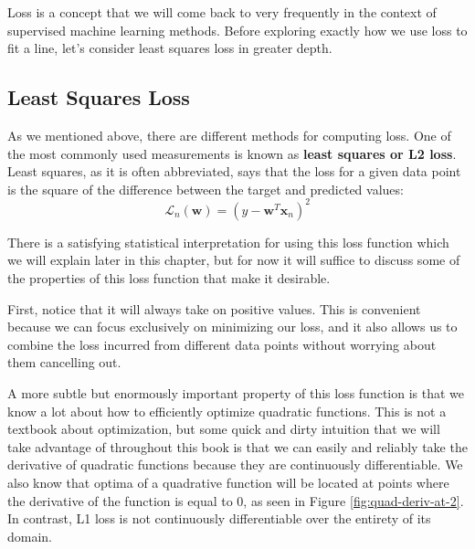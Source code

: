 Loss is a concept that we will come back to very frequently in the context of supervised machine learning methods. Before exploring exactly how we use loss to fit a line, let's consider least squares loss in greater depth.

\subsection{Least Squares Loss}
As we mentioned above, there are different methods for computing loss. One of the most commonly used measurements is known as \textbf{least squares or L2 loss}. Least squares, as it is often abbreviated, says that the loss for a given data point is the square of the difference between the target and predicted values:
\begin{equation} \label{least-squares-loss-fn}
    \mathcal{L}_{n}(\textbf{w}) = (y - \textbf{w}^{T}\textbf{x}_{n})^2
\end{equation}


There is a satisfying statistical interpretation for using this loss function which we will explain later in this chapter, but for now it will suffice to discuss some of the properties of this loss function that make it desirable.

First, notice that it will always take on positive values. This is convenient because we can focus exclusively on minimizing our loss, and it also allows us to combine the loss incurred from different data points without worrying about them cancelling out.

A more subtle but enormously important property of this loss function is that we know a lot about how to efficiently optimize quadratic functions. This is not a textbook about optimization, but some quick and dirty intuition that we will take advantage of throughout this book is that we can easily and reliably take the derivative of quadratic functions because they are continuously differentiable. We also know that optima of a quadrative function will be located at points where the derivative of the function is equal to 0, as seen in Figure \ref{fig:quad-deriv-at-2}. In contrast, L1 loss is not continuously differentiable over the entirety of its domain.


